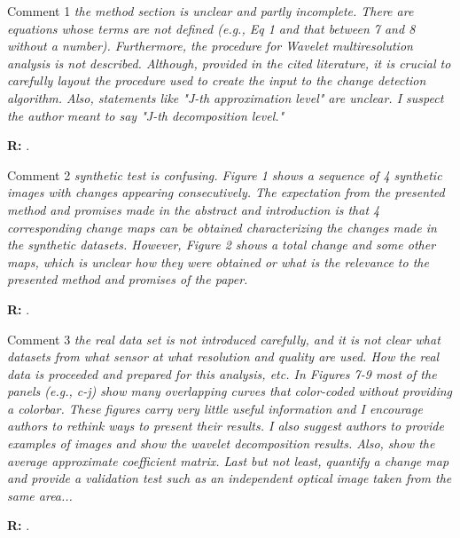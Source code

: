 \documentclass[11pt]{report}
\begin{document}
\medskip
\begin{mybox}{Comment 1}
\textit{the method section is unclear and partly incomplete. There are equations whose terms are not defined (e.g., Eq 1 and
that between 7 and 8 without a number). Furthermore, the procedure for Wavelet multiresolution analysis is not
described. Although, provided in the cited literature, it is crucial to carefully layout the procedure used to create the input
to the change detection algorithm. Also, statements like "J-th approximation level" are unclear. I suspect the author
meant to say "J-th decomposition level."}


\medskip
\textbf{R:} .
\end{mybox}

\medskip


\begin{mybox}{Comment 2}
\textit{synthetic test is confusing. Figure 1 shows a sequence of 4 synthetic images with changes appearing consecutively.
The expectation from the presented method and promises made in the abstract and introduction is that 4 corresponding
change maps can be obtained characterizing the changes made in the synthetic datasets. However, Figure 2 shows a
total change and some other maps, which is unclear how they were obtained or what is the relevance to the presented
method and promises of the paper.}

\medskip

\textbf{R:} .
\end{mybox}



\vspace{0.3cm}


\medskip

\begin{mybox}{Comment 3}
\textit{the real data set is not introduced carefully, and it is not clear what datasets from what sensor at what resolution and
quality are used. How the real data is proceeded and prepared for this analysis, etc. In Figures 7-9 most of the panels
(e.g., c-j) show many overlapping curves that color-coded without providing a colorbar. These figures carry very little
useful information and I encourage authors to rethink ways to present their results. I also suggest authors to provide
examples of images and show the wavelet decomposition results. Also, show the average approximate coefficient
matrix. Last but not least, quantify a change map and provide a validation test such as an independent optical image
taken from the same area...}

\medskip

\textbf{R:} .
\end{mybox}






\vspace{0.3cm}




\end{document}

